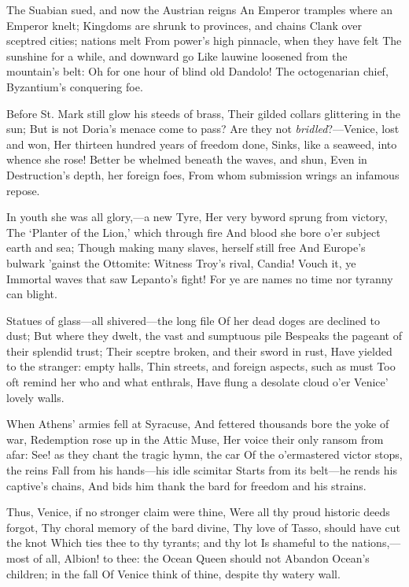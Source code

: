\documentclass[10pt,twocolumn]{book}
\begin{document}
   The Suabian sued, and now the Austrian reigns\textemdash
   An Emperor tramples where an Emperor knelt;
   Kingdoms are shrunk to provinces, and chains
   Clank over sceptred cities; nations melt
   From power's high pinnacle, when they have felt
   The sunshine for a while, and downward go
   Like lauwine loosened from the mountain's belt:
   Oh for one hour of blind old Dandolo!
The octogenarian chief, Byzantium's conquering foe.


   Before St. Mark still glow his steeds of brass,
   Their gilded collars glittering in the sun;
   But is not Doria's menace come to pass?
   Are they not \textit{bridled}?---Venice, lost and won,
   Her thirteen hundred years of freedom done,
   Sinks, like a seaweed, into whence she rose!
   Better be whelmed beneath the waves, and shun,
   Even in Destruction's depth, her foreign foes,
From whom submission wrings an infamous repose.


   In youth she was all glory,---a new Tyre,\textemdash
   Her very byword sprung from victory,
   The `Planter of the Lion,' which through fire
   And blood she bore o'er subject earth and sea;
   Though making many slaves, herself still free
   And Europe's bulwark 'gainst the Ottomite:
   Witness Troy's rival, Candia!  Vouch it, ye
   Immortal waves that saw Lepanto's fight!
For ye are names no time nor tyranny can blight.


   Statues of glass---all shivered---the long file
   Of her dead doges are declined to dust;
   But where they dwelt, the vast and sumptuous pile
   Bespeaks the pageant of their splendid trust;
   Their sceptre broken, and their sword in rust,
   Have yielded to the stranger:  empty halls,
   Thin streets, and foreign aspects, such as must
   Too oft remind her who and what enthrals,
Have flung a desolate cloud o'er Venice' lovely walls.


   When Athens' armies fell at Syracuse,
   And fettered thousands bore the yoke of war,
   Redemption rose up in the Attic Muse,
   Her voice their only ransom from afar:
   See! as they chant the tragic hymn, the car
   Of the o'ermastered victor stops, the reins
   Fall from his hands---his idle scimitar
   Starts from its belt---he rends his captive's chains,
And bids him thank the bard for freedom and his strains.


   Thus, Venice, if no stronger claim were thine,
   Were all thy proud historic deeds forgot,
   Thy choral memory of the bard divine,
   Thy love of Tasso, should have cut the knot
   Which ties thee to thy tyrants; and thy lot
   Is shameful to the nations,---most of all,
   Albion! to thee:  the Ocean Queen should not
   Abandon Ocean's children; in the fall
Of Venice think of thine, despite thy watery wall.
\end{document}
